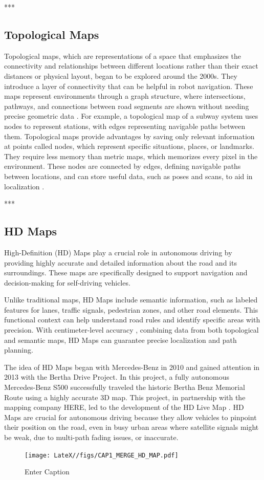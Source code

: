 ***

\subsection{Topological Maps}
Topological maps, which are representations of a space that emphasizes the connectivity and relationships between different locations rather than their exact distances or physical layout, began to be explored around the 2000s. They introduce a layer of connectivity that can be helpful in robot navigation. These maps represent environments through a graph structure, where intersections, pathways, and connections between road segments are shown without needing precise geometric data \cite{li2020survey}. For example, a topological map of a subway system uses nodes to represent stations, with edges representing navigable paths between them. \cite{8105770}
Topological maps provide advantages by saving only relevant information at points called nodes, which represent specific situations, places, or landmarks. They require less memory than metric maps, which memorizes every pixel in the environment. These nodes are connected by edges, defining navigable paths between locations, and can store useful data, such as poses and scans, to aid in localization \cite{murciego2021topological}.

***



\subsection{HD Maps}
High-Definition (HD) Maps play a crucial role in autonomous driving by providing highly accurate and detailed information about the road and its surroundings. These maps are specifically designed to support navigation and decision-making for self-driving vehicles.

Unlike traditional maps, HD Maps include semantic information, such as labeled features for lanes, traffic signals, pedestrian zones, and other road elements. This functional context can help understand road rules and identify specific areas with precision. With centimeter-level accuracy \cite{geospatialworld_hd_maps}, combining data from both topological and semantic maps, HD Maps can guarantee precise localization and path planning.

The idea of HD Maps began with Mercedes-Benz in 2010 and gained attention in 2013 with the Bertha Drive Project. In this project, a fully autonomous Mercedes-Benz S500 successfully traveled the historic Bertha Benz Memorial Route using a highly accurate 3D map. This project, in partnership with the mapping company HERE, led to the development of the HD Live Map \cite{8105770}.
HD Maps are crucial for autonomous driving because they allow vehicles to pinpoint their position on the road, even in busy urban areas where satellite signals might be weak, due to multi-path fading issues, or inaccurate.
\begin{figure}[H]
    \centering
    \texttt{[image: LateX//figs/CAP1\_MERGE\_HD\_MAP.pdf]}
    \caption{Enter Caption}
    \label{fig:enter-label}
\end{figure}

